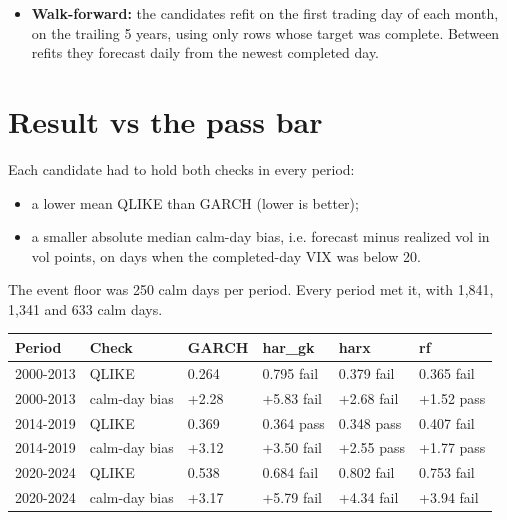 \documentclass{article}
\begin{document}
\begin{itemize}
\begin{itemize}
\item \texttt{rf}: a random forest on the \texttt{harx} inputs, with 300 trees and at least 20 rows per leaf, fixed before the run.

\end{itemize}

\item \textbf{Walk-forward:} the candidates refit on the first trading day of each month, on the trailing 5 years, using only rows whose target was complete. Between refits they forecast daily from the newest completed day.

\end{itemize}

\section{Result vs the pass bar}

Each candidate had to hold both checks in every period:

\begin{itemize}

\item a lower mean QLIKE than GARCH (lower is better);

\item a smaller absolute median calm-day bias, i.e. forecast minus realized vol in vol points, on days when the completed-day VIX was below 20.

\end{itemize}

The event floor was 250 calm days per period. Every period met it, with 1,841, 1,341 and 633 calm days.

\begin{center}\small
\begin{tabularx}{\linewidth}{l >{\raggedright\arraybackslash}X l l l l}
\toprule
\textbf{Period} & \textbf{Check} & \textbf{GARCH} & \textbf{har\_gk} & \textbf{harx} & \textbf{rf} \\
\midrule
2000-2013 & QLIKE & 0.264 & 0.795 fail & 0.379 fail & 0.365 fail \\
2000-2013 & calm-day bias & +2.28 & +5.83 fail & +2.68 fail & +1.52 pass \\
2014-2019 & QLIKE & 0.369 & 0.364 pass & 0.348 pass & 0.407 fail \\
2014-2019 & calm-day bias & +3.12 & +3.50 fail & +2.55 pass & +1.77 pass \\
2020-2024 & QLIKE & 0.538 & 0.684 fail & 0.802 fail & 0.753 fail \\
2020-2024 & calm-day bias & +3.17 & +5.79 fail & +4.34 fail & +3.94 fail \\
\bottomrule
\end{tabularx}
\end{center}
\end{document}
